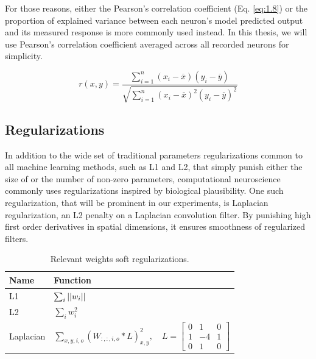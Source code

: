 For those reasons, either the Pearson’s correlation coefficient (Eq. \ref{eq:1.8}) or the proportion of explained variance between each neuron’s model predicted output and its measured response is more commonly used instead. In this thesis, we will use Pearson’s correlation coefficient averaged across all recorded neurons for simplicity.

\begin{equation}\label{eq:1.8}
r(x, y) = \frac{{}\sum_{i=1}^{n} (x_i - \overline{x})(y_i - \overline{y})}
{\sqrt{\sum_{i=1}^{n} (x_i - \overline{x})^2(y_i - \overline{y})^2}}
\end{equation}

\subsection{Regularizations}
In addition to the wide set of traditional parameters regularizations common to all machine learning methods, such as L1 and L2, that simply punish either the size of or the number of non-zero parameters, computational neuroscience commonly uses regularizations inspired by biological plausibility. One such regularization, that will be prominent in our experiments, is Laplacian regularization, an L2 penalty on a Laplacian convolution filter. By punishing high first order derivatives in spatial dimensions, it ensures smoothness of regularized filters.

\begin{table}[h]
    \renewcommand{\arraystretch}{1.2}
    \centering
    \begin{tabular}{l|l}
        \toprule
        \textbf{Name} & \textbf{Function} \\ \midrule
        L1 & $\sum_i \left|{|w_i|}\right|$ \\ 
        L2 & $\sum_i w_i^2$ \\ 
        Laplacian & $\sum_{x,y, i, o}(W_{:,:, i, o}*L)_{x,y}^2, \quad L=\left[\begin{smallmatrix}
0 & 1 & 0\\
1 & -4 & 1\\
0 & 1 & 0\end{smallmatrix}\right]$
 \\ \bottomrule
    \end{tabular}
    \caption[Relevant weights soft regularizations.]{Relevant weights soft regularizations.}
    \label{tab:1.2}
    \renewcommand{\arraystretch}{1.0}
\end{table}
